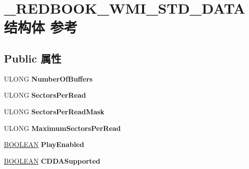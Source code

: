 \hypertarget{struct___r_e_d_b_o_o_k___w_m_i___s_t_d___d_a_t_a}{}\section{\+\_\+\+R\+E\+D\+B\+O\+O\+K\+\_\+\+W\+M\+I\+\_\+\+S\+T\+D\+\_\+\+D\+A\+T\+A结构体 参考}
\label{struct___r_e_d_b_o_o_k___w_m_i___s_t_d___d_a_t_a}
\subsection*{Public 属性}
\begin{DoxyCompactItemize}
\item 
\mbox{\label{struct___r_e_d_b_o_o_k___w_m_i___s_t_d___d_a_t_a_a39d1e4ef938cbd059fcd7f9b3c3d54f0}} 
U\+L\+O\+NG {\bfseries Number\+Of\+Buffers}
\item 
\mbox{\label{struct___r_e_d_b_o_o_k___w_m_i___s_t_d___d_a_t_a_aed0e792c4de2e1c64c951a846898e336}} 
U\+L\+O\+NG {\bfseries Sectors\+Per\+Read}
\item 
\mbox{\label{struct___r_e_d_b_o_o_k___w_m_i___s_t_d___d_a_t_a_ad754a6b3e92a8d43b961af4a5b433300}} 
U\+L\+O\+NG {\bfseries Sectors\+Per\+Read\+Mask}
\item 
\mbox{\label{struct___r_e_d_b_o_o_k___w_m_i___s_t_d___d_a_t_a_a07fefdaa69baefa839d3e06b6ca4cc23}} 
U\+L\+O\+NG {\bfseries Maximum\+Sectors\+Per\+Read}
\item 
\mbox{\label{struct___r_e_d_b_o_o_k___w_m_i___s_t_d___d_a_t_a_afe7bd9ca3cedb821b512fb3b63aba5be}} 
\hyperlink{_processor_bind_8h_a112e3146cb38b6ee95e64d85842e380a}{B\+O\+O\+L\+E\+AN} {\bfseries Play\+Enabled}
\item 
\mbox{\label{struct___r_e_d_b_o_o_k___w_m_i___s_t_d___d_a_t_a_a94b1e8557e9ba254bcb06680fbad2634}} 
\hyperlink{_processor_bind_8h_a112e3146cb38b6ee95e64d85842e380a}{B\+O\+O\+L\+E\+AN} {\bfseries C\+D\+D\+A\+Supported}

\end{DoxyCompactItemize}

